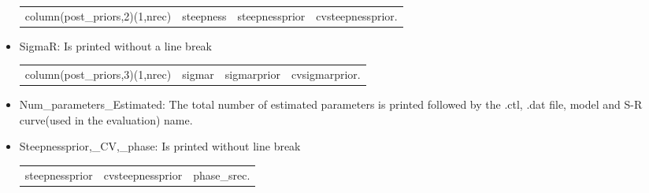 \documentclass{article}
\begin{document}
\begin{itemize}
    \begin{center}
        \begin{tabular}{c c c c}
            column(post\_priors,2)(1,nrec) &  steepness & steepnessprior &  cvsteepnessprior.\\
        \end{tabular}
    \end{center}
    \item SigmaR:  Is printed without a line break
    \begin{center}
        \begin{tabular}{c c c c}
           column(post\_priors,3)(1,nrec)  &  sigmar &  sigmarprior & cvsigmarprior.\\
        \end{tabular}
    \end{center}
    \item Num\_parameters\_Estimated: The total number of estimated parameters is printed followed by the .ctl, .dat file, model and S-R curve(used in the evaluation) name.
    \item Steepnessprior,\_CV,\_phase: Is printed without line break 
    \begin{center}
        \begin{tabular}{c c c}
         steepnessprior    &  cvsteepnessprior & phase\_srec.\\
        \end{tabular}
    \end{center}


\end{itemize}
\end{document}
